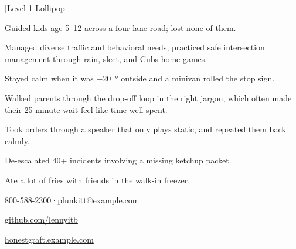 \documentclass[palette=walnut]{mosaicresume}
\begin{document}
\begin{threecolumns}
\nextcolumn
{}
[Level 1 Lollipop]
\begin{rbullets}
  \item Guided kids age 5--12 across a four-lane road; lost none of them.
  \item Managed diverse traffic and behavioral needs, practiced safe intersection management through rain, sleet, and Cubs home games.
  \item Stayed calm when it was \qty{-20}{\degree} outside and a minivan rolled the stop sign.
  \item Walked parents through the drop-off loop in the right jargon, which often made their 25-minute wait feel like time well spent.
\end{rbullets}
\gapafter
{}
\begin{rbullets}
  \item Took orders through a speaker that only plays static, and repeated them back calmly.
  \item De-escalated 40+ incidents involving a missing ketchup packet.
  \item Ate a lot of fries with friends in the walk-in freezer.
\end{rbullets}
\end{threecolumns}

\contactfooter
  {800-588-2300\enspace·\enspace\href{mailto:plunkitt@example.com}{plunkitt@example.com}\par
   }
  {\href{https://github.com/lennyitb}{github.com/lennyitb}\par
   \href{https://example.com}{honestgraft.example.com}}
\end{document}
